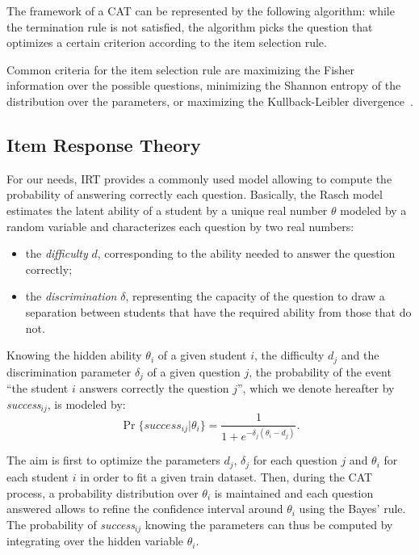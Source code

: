 \documentclass{sig-alternate}
\begin{document}
The framework of a CAT can be represented by the following algorithm: while the termination rule is not satisfied, the algorithm picks the question that optimizes a certain criterion according to the item selection rule.

Common criteria for the item selection rule are maximizing the Fisher information over the possible questions, minimizing the Shannon entropy of the distribution over the parameters, or maximizing the Kullback-Leibler divergence~\cite{Xu2003}. %

\subsection{Item Response Theory}

For our needs, IRT provides a commonly used model allowing to compute the probability of answering correctly each question. Basically, the Rasch model estimates the latent ability of a student by a unique real number $\theta$ modeled by a random variable and characterizes each question by two real numbers:

\begin{itemize}
\item the \emph{difficulty} $d$, corresponding to the ability needed to answer the question correctly;
\item the \emph{discrimination} $\delta$, representing the capacity of the question to draw a separation between students that have the required ability from those that do not.
\end{itemize}

Knowing the hidden ability $\theta_i$ of a given student $i$, the difficulty $d_j$ and the discrimination parameter $\delta_j$ of a given question $j$, the probability of the event ``the student $i$ answers correctly the question $j$'', which we denote hereafter by \emph{success}$_{ij}$, is modeled by:
\[ \Pr\{success_{ij}|\theta_i\} = \frac1{1+e^{-\delta_j(\theta_i - d_j)}}. \]

The aim is first to optimize the parameters $d_j$, $\delta_j$ for each question $j$ and $\theta_i$ for each student $i$ in order to fit a given train dataset. Then, during the CAT process, a probability distribution over $\theta_i$ is maintained and each question answered allows to refine the confidence interval around $\theta_i$ using the Bayes' rule. The probability of \emph{success}$_{ij}$ knowing the parameters can thus be computed by integrating over the hidden variable $\theta_i$.
\end{document}
